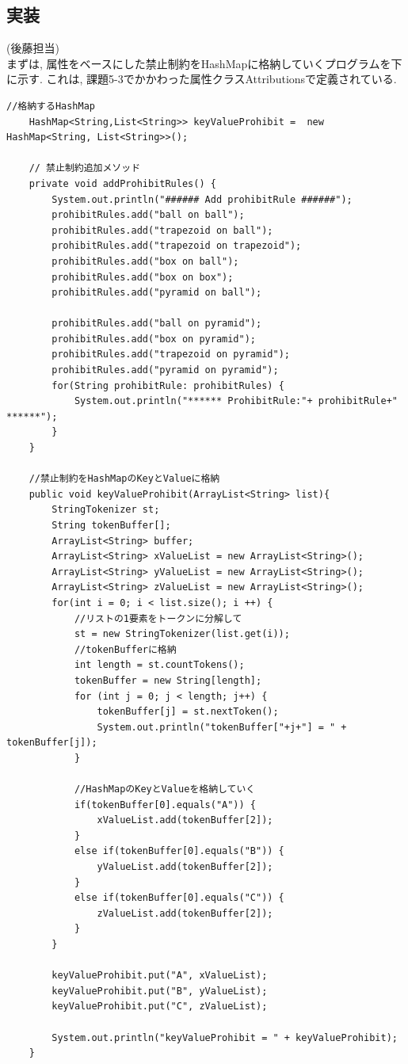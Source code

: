 \documentclass[uplatex,12pt]{jsarticle}
\begin{document}
\subsection{実装}
\noindent (後藤担当) \\
まずは, 属性をベースにした禁止制約をHashMapに格納していくプログラムを下に示す. これは, 課題5-3でかかわった属性クラスAttributionsで定義されている.
\begin{lstlisting}[caption=禁止制約をHashMapに管理, label=src:No1]
	//格納するHashMap
	HashMap<String,List<String>> keyValueProhibit =  new HashMap<String, List<String>>();

	// 禁止制約追加メソッド
	private void addProhibitRules() {
		System.out.println("###### Add prohibitRule ######");
		prohibitRules.add("ball on ball");
		prohibitRules.add("trapezoid on ball");
		prohibitRules.add("trapezoid on trapezoid");
		prohibitRules.add("box on ball");
		prohibitRules.add("box on box");
		prohibitRules.add("pyramid on ball");

		prohibitRules.add("ball on pyramid");
		prohibitRules.add("box on pyramid");
		prohibitRules.add("trapezoid on pyramid");
		prohibitRules.add("pyramid on pyramid");
		for(String prohibitRule: prohibitRules) {
			System.out.println("****** ProhibitRule:"+ prohibitRule+" ******");
		}
	}

	//禁止制約をHashMapのKeyとValueに格納
	public void keyValueProhibit(ArrayList<String> list){
		StringTokenizer st;
		String tokenBuffer[];
		ArrayList<String> buffer;
		ArrayList<String> xValueList = new ArrayList<String>();
		ArrayList<String> yValueList = new ArrayList<String>();
		ArrayList<String> zValueList = new ArrayList<String>();
		for(int i = 0; i < list.size(); i ++) {
			//リストの1要素をトークンに分解して
			st = new StringTokenizer(list.get(i));
			//tokenBufferに格納
			int length = st.countTokens();
			tokenBuffer = new String[length];
			for (int j = 0; j < length; j++) {
				tokenBuffer[j] = st.nextToken();
				System.out.println("tokenBuffer["+j+"] = " + tokenBuffer[j]);
			}

			//HashMapのKeyとValueを格納していく
			if(tokenBuffer[0].equals("A")) {
				xValueList.add(tokenBuffer[2]);
			}
			else if(tokenBuffer[0].equals("B")) {
				yValueList.add(tokenBuffer[2]);
			}
			else if(tokenBuffer[0].equals("C")) {
				zValueList.add(tokenBuffer[2]);
			}
		}

		keyValueProhibit.put("A", xValueList);
		keyValueProhibit.put("B", yValueList);
		keyValueProhibit.put("C", zValueList);

		System.out.println("keyValueProhibit = " + keyValueProhibit);
	}
\end{lstlisting}
\end{document}
